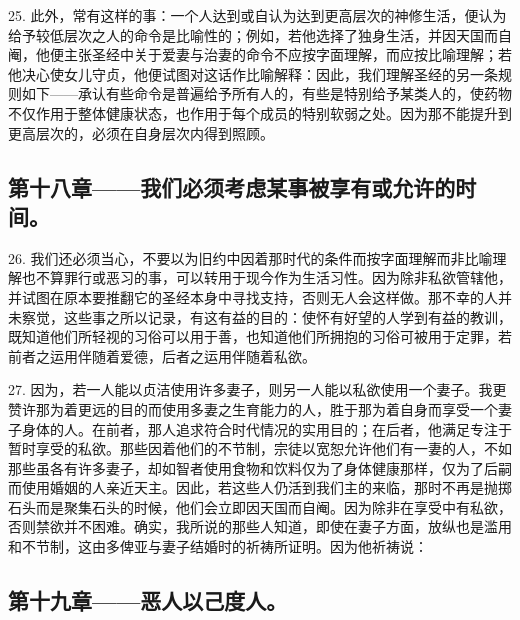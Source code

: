25. 此外，常有这样的事：一个人达到或自认为达到更高层次的神修生活，便认为给予较低层次之人的命令是比喻性的；例如，若他选择了独身生活，并因天国而自阉，他便主张圣经中关于爱妻与治妻的命令不应按字面理解，而应按比喻理解；若他决心使女儿守贞，他便试图对这话作比喻解释：因此，我们理解圣经的另一条规则如下——承认有些命令是普遍给予所有人的，有些是特别给予某类人的，使药物不仅作用于整体健康状态，也作用于每个成员的特别软弱之处。因为那不能提升到更高层次的，必须在自身层次内得到照顾。\par


\subsection{第十八章——我们必须考虑某事被享有或允许的时间。}

26. 我们还必须当心，不要以为旧约中因着那时代的条件而按字面理解而非比喻理解也不算罪行或恶习的事，可以转用于现今作为生活习性。因为除非私欲管辖他，并试图在原本要推翻它的圣经本身中寻找支持，否则无人会这样做。那不幸的人并未察觉，这些事之所以记录，有这有益的目的：使怀有好望的人学到有益的教训，既知道他们所轻视的习俗可以用于善，也知道他们所拥抱的习俗可被用于定罪，若前者之运用伴随着爱德，后者之运用伴随着私欲。\par

27. 因为，若一人能以贞洁使用许多妻子，则另一人能以私欲使用一个妻子。我更赞许那为着更远的目的而使用多妻之生育能力的人，胜于那为着自身而享受一个妻子身体的人。在前者，那人追求符合时代情况的实用目的；在后者，他满足专注于暂时享受的私欲。那些因着他们的不节制，宗徒以宽恕允许他们有一妻的人，不如那些虽各有许多妻子，却如智者使用食物和饮料仅为了身体健康那样，仅为了后嗣而使用婚姻的人亲近天主。因此，若这些人仍活到我们主的来临，那时不再是抛掷石头而是聚集石头的时候，他们会立即因天国而自阉。因为除非在享受中有私欲，否则禁欲并不困难。确实，我所说的那些人知道，即使在妻子方面，放纵也是滥用和不节制，这由多俾亚与妻子结婚时的祈祷所证明。因为他祈祷说：\par


\subsection{第十九章——恶人以己度人。}

